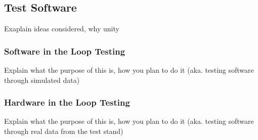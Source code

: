 \subsection{Test Software}

Exaplain ideas considered, why unity

\subsubsection{Software in the Loop Testing}

Explain what the purpose of this is, how you plan to do it (aka. testing software through simulated data)

\subsubsection{Hardware in the Loop Testing}

Explain what the purpose of this is, how you plan to do it (aka. testing software through real data from the test stand)